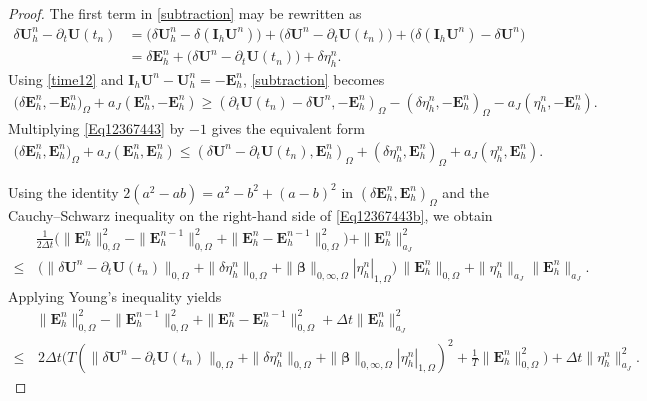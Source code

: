 \documentclass[10pt,a4paper]{amsart}
\newcommand\bE{\mathbf{E}}
\newcommand\bU{\mathbf{U}}
\newcommand\bbeta{{\boldsymbol{\beta}}}
\begin{document}
\begin{proof}
The first term in \eqref{subtraction} may be rewritten as
\begin{align}
	\delta \bU^{n}_{h}-\partial_{t} \bU(t_{n})
	&=\big(\delta \bU^{n}_{h}- \delta(\mathbf{I}_{h}\bU^{n})\big)
	+\big(\delta\bU^{n}-\partial_{t} \bU(t_{n})\big)
	+\big(\delta(\mathbf{I}_{h}\bU^{n})-\delta\bU^{n}\big)\nonumber\\
	&= \delta \bE^{n}_{h}+\big(\delta\bU^{n}-\partial_{t} \bU(t_{n})\big)+\delta \eta^{n}_{h}. \label{time12}
\end{align}
Using \eqref{time12} and $\mathbf I_h\bU^n-\bU_h^n=-\bE_h^n$, \eqref{subtraction} becomes
\begin{align}\label{Eq12367443}
	\big(\delta \bE^{n}_{h}, -\bE^{n}_{h}\big)_{\Omega}+a_{J}(\bE^{n}_{h},-\bE^{n}_{h})
	\geq
	(\partial_{t} \bU(t_{n})-\delta \bU^{n},-\bE^{n}_{h})_{\Omega}
	-(\delta \eta^{n}_{h}, -\bE^{n}_{h})_{\Omega}
	-a_{J}( \eta^{n}_{h}, -\bE^{n}_{h}).
\end{align}
Multiplying \eqref{Eq12367443} by $-1$ gives the equivalent form
\begin{align}\label{Eq12367443b}
	\big(\delta \bE^{n}_{h}, \bE^{n}_{h}\big)_{\Omega}+a_{J}(\bE^{n}_{h},\bE^{n}_{h})
	\leq
	(\delta \bU^{n}-\partial_{t} \bU(t_{n}),\bE^{n}_{h})_{\Omega}
	+(\delta \eta^{n}_{h}, \bE^{n}_{h})_{\Omega}
	+a_{J}( \eta^{n}_{h}, \bE^{n}_{h}).
\end{align}

Using the identity $2(a^{2}-ab)=a^{2}-b^{2}+(a-b)^{2}$ in $(\delta\bE_h^n,\bE_h^n)_\Omega$ and the Cauchy--Schwarz inequality on the right-hand side of \eqref{Eq12367443b}, we obtain
\begin{align*}
	&\frac{1}{2\Delta t}\Big(\|\bE_h^n \|_{0,\Omega}^2-\| \bE_h^{n-1}\|_{0,\Omega}^2+\|\bE_h^n - \bE_h^{n-1}\|_{0,\Omega}^2\Big)
	+ \|\bE_h^n\|_{a_J}^2\\
	\leq&\, \Big(\|\delta \bU^{n}-\partial_{t}\bU(t_n)\|_{0,\Omega}+\|\delta\eta_h^n\|_{0,\Omega}
	+\|\bbeta\|_{0,\infty,\Omega} |\eta_h^n|_{1,\Omega}\Big)\, \|\bE_h^n\|_{0,\Omega} + \|\eta_h^n\|_{a_J} \|\bE_h^n\|_{a_J}.
\end{align*}
Applying Young's inequality yields
\begin{align*}
	&\|\bE_h^n \|_{0,\Omega}^2-\| \bE_h^{n-1}\|_{0,\Omega}^2+\|\bE_h^n - \bE_h^{n-1}\|_{0,\Omega}^2
	+ \Delta t \|\bE_h^n\|_{a_J}^{2}\\
	\leq&\,  2\Delta t\Big(T(\|\delta \bU^{n}-\partial_{t}\bU(t_n)\|_{0,\Omega}+\|\delta\eta_h^n\|_{0,\Omega}
	+\|\bbeta\|_{0,\infty,\Omega} |\eta_h^n|_{1,\Omega})^2+\frac{1}{T}\|\bE_h^n\|_{0,\Omega}^2\Big)
	+\Delta t \| \eta_h^n\|_{a_J}^{2}.
\end{align*}


\end{proof}
\end{document}
